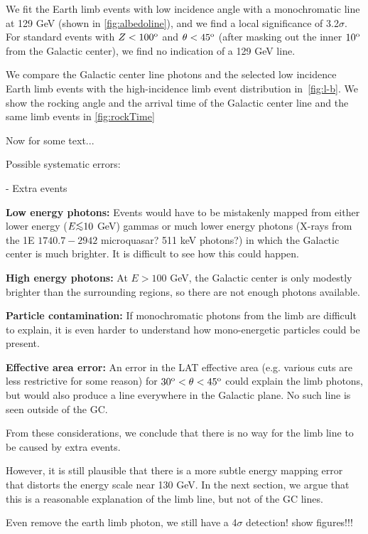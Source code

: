 \documentclass[aps,twocolumn,prd,superscriptaddress,showpacs,nofootinbib,fixfloat]{revtex4}
\newcommand{\degree}{^{\rm o}}
\def\la{\vcenter{\hbox{$<$}\offinterlineskip\hbox{$\sim$}}}
\begin{document}
We fit the Earth limb events with low
incidence angle with a monochromatic line at 129 GeV (shown
in \ref{fig:albedoline}), and we find a local significance
of 3.2$\sigma$. For standard events with $Z<100\degree$ and
$\theta<45\degree$ (after masking out the inner $10\degree$
from the Galactic center), we find no indication of a 129
GeV line.

We compare the Galactic center line photons and the selected
low incidence Earth limb events with the high-incidence limb
event distribution in~\ref{fig:l-b}. We show the rocking
angle and the arrival time of the Galactic center line and
the same limb events in \ref{fig:rockTime}




Now for some text...

Possible systematic errors:

- Extra events

{\bf Low energy photons:} Events would have to be mistakenly mapped from
either lower energy ($E \la 10$ GeV) gammas or much lower energy photons
(X-rays from the 1E $1740.7-2942$ microquasar?  511 keV photons?) in which the
Galactic center is much brighter.  It is difficult to see how this could
happen.

{\bf High energy photons:} At $E > 100$ GeV, the Galactic center is only
modestly brighter than the surrounding regions, so there are not enough
photons available.

{\bf Particle contamination:} If monochromatic photons from the limb are
difficult to explain, it is even harder to understand how mono-energetic
particles could be present. 

{\bf Effective area error:} An error in the LAT effective area (e.g. various
cuts are less restrictive for some reason) for $30\degree < \theta <
45\degree$ could explain the limb photons, but would also produce a line
everywhere in the Galactic plane.  No such line is seen outside of the GC. 

From these considerations, we conclude that there is no way for the limb line
to be caused by extra events. 

However, it is still plausible that there is a more subtle energy mapping
error that distorts the energy scale near 130 GeV.  In the next section, we
argue that this is a reasonable explanation of the limb line, but not of the
GC lines. 


Even remove the earth limb photon, we still have a 4$\sigma$ detection! show figures!!!
\end{document}
